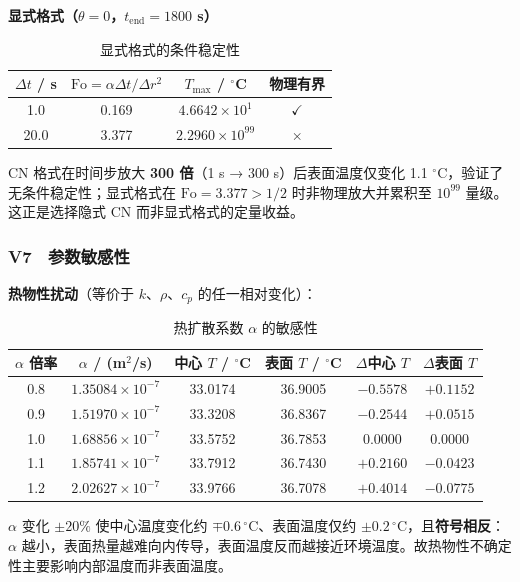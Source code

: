 \documentclass[12pt,a4paper]{ctexart}
\begin{document}
\textbf{显式格式（$\theta=0$，$t_{\text{end}}=1800$ s）}

\begin{table}[H]
\centering
\caption{显式格式的条件稳定性}
\begin{tabular}{cccc}
\toprule
$\Delta t$ / s & $\mathrm{Fo}=\alpha\Delta t/\Delta r^{2}$ & $T_{\max}$ / $^\circ$C & 物理有界 \\
\midrule
1.0 & 0.169 & $4.6642\times10^{1}$ & $\checkmark$ \\
20.0 & 3.377 & $2.2960\times10^{99}$ & $\times$ \\
\bottomrule
\end{tabular}
\end{table}

CN 格式在时间步放大 \textbf{300 倍}（1 s → 300 s）后表面温度仅变化 1.1 $^\circ$C，验证了无条件稳定性；显式格式在 $\mathrm{Fo}=3.377>1/2$ 时非物理放大并累积至 $10^{99}$ 量级。这正是选择隐式 CN 而非显式格式的定量收益。

\subsubsection*{V7　参数敏感性}

\textbf{热物性扰动}（等价于 $k$、$\rho$、$c_p$ 的任一相对变化）：

\begin{table}[H]
\centering
\caption{热扩散系数 $\alpha$ 的敏感性}
\begin{tabular}{cccccc}
\toprule
$\alpha$ 倍率 & $\alpha$ / (m$^2$/s) & 中心 $T$ / $^\circ$C & 表面 $T$ / $^\circ$C & $\Delta$中心 $T$ & $\Delta$表面 $T$ \\
\midrule
0.8 & $1.35084\times10^{-7}$ & 33.0174 & 36.9005 & $-0.5578$ & $+0.1152$ \\
0.9 & $1.51970\times10^{-7}$ & 33.3208 & 36.8367 & $-0.2544$ & $+0.0515$ \\
1.0 & $1.68856\times10^{-7}$ & 33.5752 & 36.7853 & $0.0000$ & $0.0000$ \\
1.1 & $1.85741\times10^{-7}$ & 33.7912 & 36.7430 & $+0.2160$ & $-0.0423$ \\
1.2 & $2.02627\times10^{-7}$ & 33.9766 & 36.7078 & $+0.4014$ & $-0.0775$ \\
\bottomrule
\end{tabular}
\end{table}

$\alpha$ 变化 $\pm20\%$ 使中心温度变化约 $\mp0.6\,^\circ$C、表面温度仅约 $\pm0.2\,^\circ$C，且\textbf{符号相反}：$\alpha$ 越小，表面热量越难向内传导，表面温度反而越接近环境温度。故热物性不确定性主要影响内部温度而非表面温度。
\end{document}
